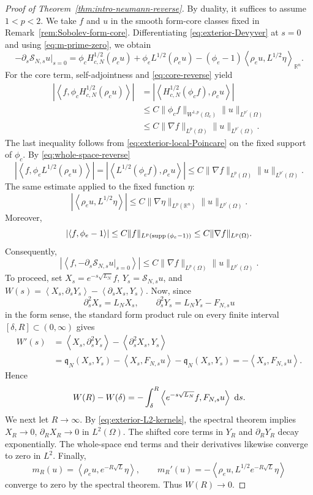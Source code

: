 \documentclass[12pt]{amsart}
\newcommand\R{\mathbb{R}}
\newcommand\dd{\,{\rm d}}
\newcommand{\supp}{{\rm supp}{\hspace{.05cm}}}
\newcommand{\ip}[2]{\left\langle #1,#2\right\rangle}
\newcommand{\abs}[1]{\left\lvert #1\right\rvert}
\theoremstyle{remark}
\begin{document}
\begin{proof}[Proof of Theorem~\ref{thm:intro-neumann-reverse}]

By duality, it suffices to assume \(1<p<2\).  We take $f$ and $u$ in
the smooth form-core classes fixed in Remark~\ref{rem:Sobolev-form-core}. Differentiating \eqref{eq:exterior-Devyver} at $s=0$ and using
\eqref{eq:m-prime-zero}, we obtain
\[
 -\partial_s\mathcal S_{N,s}u|_{s=0}
 =\phi_cH_{c,N}^{1/2}(\rho_cu)
 +\phi_eL^{1/2}(\rho_eu)
 -(\phi_e-1)\ip{\rho_eu}{L^{1/2}\eta}_{\R^n}.
\]
For the core term, self-adjointness and \eqref{eq:core-reverse} yield
\begin{align*}
 \abs{\ip f{\phi_cH_{c,N}^{1/2}(\rho_cu)}}
 &=\abs{\ip{H_{c,N}^{1/2}(\phi_cf)}{\rho_cu}}\\
 &\leq C\|\phi_cf\|_{W^{1,p}(\Omega_c)}\|u\|_{L^{p'}(\Omega)}\\
 &\leq C\|\nabla f\|_{L^p(\Omega)}\|u\|_{L^{p'}(\Omega)}.
\end{align*}
The last inequality follows from \eqref{eq:exterior-local-Poincare} on
the fixed support of $\phi_c$. By \eqref{eq:whole-space-reverse} 
\[
 \abs{\ip f{\phi_eL^{1/2}(\rho_eu)}}
 =\abs{\ip{L^{1/2}(\phi_ef)}{\rho_eu}}
 \leq C\|\nabla f\|_{L^p(\Omega)}\|u\|_{L^{p'}(\Omega)}.
\]
The same estimate applied to the fixed function $\eta$:
\[
 \abs{\ip{\rho_eu}{L^{1/2}\eta}}
 \leq C\|\nabla\eta\|_{L^p(\R^n)}\|u\|_{L^{p'}(\Omega)}.
\]
Moreover,
\[
 \abs{\ip f{\phi_e-1}}
 \leq C\|f\|_{L^p(\supp(\phi_e-1))}
 \leq C\|\nabla f\|_{L^p(\Omega)}.
\]
Consequently,
\[
 \abs{\ip f{-\partial_s\mathcal S_{N,s}u|_{s=0}}}
 \leq C\|\nabla f\|_{L^p(\Omega)}\|u\|_{L^{p'}(\Omega)}.
\]
To proceed, set $X_s=e^{-s\sqrt{L_N}}f$, $Y_s=\mathcal S_{N,s}u$, and $W(s)=\ip{X_s}{\partial_sY_s}-\ip{\partial_sX_s}{Y_s}$. Now, since
\[
 \partial_s^2X_s=L_NX_s,
 \qquad \partial_s^2Y_s=L_NY_s-F_{N,s}u
\]
in the form sense, the standard form product rule on every finite interval
$[\delta,R]\subset(0,\infty)$ gives
\begin{align*}
 W'(s)
 &=\ip{X_s}{\partial_s^2Y_s}
   -\ip{\partial_s^2X_s}{Y_s}\\
 &=\mathfrak q_N(X_s,Y_s)-\ip{X_s}{F_{N,s}u}
   -\mathfrak q_N(X_s,Y_s)
 =-\ip{X_s}{F_{N,s}u}.
\end{align*}
Hence
\[
 W(R)-W(\delta)
 =-\int_\delta^R
   \ip{e^{-s\sqrt{L_N}}f}{F_{N,s}u}\,\dd s.
\]
We next let \(R\to\infty\).  By
\eqref{eq:exterior-L2-kernels}, the spectral theorem implies $X_R\longrightarrow0$, $\partial_RX_R\longrightarrow0$ in $L^2(\Omega)$. The shifted core terms in $Y_R$ and $\partial_RY_R$ decay exponentially. The whole-space end terms and their derivatives likewise converge to zero in \(L^2\).  Finally,
\[
 m_R(u)=\ip{\rho_eu}{e^{-R\sqrt L}\eta},
 \qquad
 m_R'(u)=-\ip{\rho_eu}{L^{1/2}e^{-R\sqrt L}\eta}
\]
converge to zero by the spectral theorem.  Thus $W(R)\to0$.


\end{proof}
\end{document}
